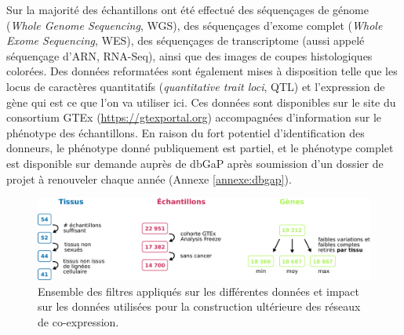 Sur la majorité des échantillons ont été effectué des séquençages de génome (\textit{Whole Genome Sequencing}, WGS), des séquençages d'exome complet (\textit{Whole Exome Sequencing}, WES), des séquençages de transcriptome (aussi appelé séquençage d'ARN, RNA-Seq), ainsi que des images de coupes histologiques colorées. Des données reformatées sont également mises à disposition telle que les locus de caractères quantitatifs (\textit{quantitative trait loci}, QTL) et l'expression de gène qui est ce que l'on va utiliser ici. Ces données sont disponibles sur le site du consortium GTEx (\url{https://gtexportal.org}) accompagnées d'information sur le phénotype des échantillons. En raison du fort potentiel d'identification des donneurs, le phénotype donné publiquement est partiel, et le phénotype complet est disponible sur demande auprès de dbGaP après soumission d'un dossier de projet à renouveler chaque année (Annexe \ref{annexe:dbgap}).


\begin{figure}
    \centering
    \includegraphics[width=1\textwidth]{img/chap2/chap2_filtre_donnees.pdf}
    \caption{Ensemble des filtres appliqués sur les différentes données et impact sur les données utilisées pour la construction ultérieure des réseaux de co-expression.}
    \label{figure:data_filters}
\end{figure}



